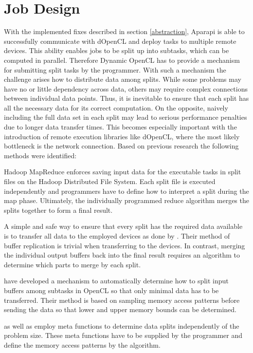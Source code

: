 \section{Job Design}
\label{job_design}
With the implemented fixes described in section \ref{abstraction}, Aparapi is able to successfully communicate with dOpenCL and deploy tasks to multiple remote devices. This ability enables jobs to be split up into subtasks, which can be computed in parallel. Therefore Dynamic OpenCL has to provide a mechanism for submitting split tasks by the programmer. With such a mechanism the challenge arises how to distribute data among splits. While some problems may have no or little dependency across data, others may require complex connections between individual data points. Thus, it is inevitable to ensure that each split has all the necessary data for its correct computation. On the opposite, naively including the full data set in each split may lead to serious performance penalties due to longer data transfer times. This becomes especially important with the introduction of remote execution libraries like dOpenCL, where the most likely bottleneck is the network connection. Based on previous research the following methods were identified:

\begin{description}[style=nextline]
	\item [Manual Splits]
	Hadoop MapReduce enforces saving input data for the executable tasks in split files on the Hadoop Distributed File System. Each split file is executed independently and programmers have to define how to interpret a split during the map phase. Ultimately, the individually programmed reduce algorithm merges the splits together to form a final result.

	\item [Naive Buffer Replication]
	A simple and safe way to ensure that every split has the required data available is to transfer all data to the employed devices as done by \citeauthor{delalama_2012}\cite{delalama_2012}. Their method of buffer replication is trivial when transferring to the devices. In contrast, merging the individual output buffers back into the final result requires an algorithm to determine which parts to merge by each split.

	\item [Intelligent Buffer Replication]
	\citeauthor{Kim_2011}\cite{Kim_2011} have developed a mechanism to automatically determine how to split input buffers among subtasks in OpenCL so that only minimal data has to be transferred. Their method is based on sampling memory access patterns before sending the data so that lower and upper memory bounds can be determined.

	\item [Meta Functions]
	\citeauthor{stepocl}\cite{stepocl} as well as \citeauthor{distcl}\cite{distcl} employ meta functions to determine data splits independently of the problem size. These meta functions have to be supplied by the programmer and define the memory access patterns by the algorithm.

\end{description}

